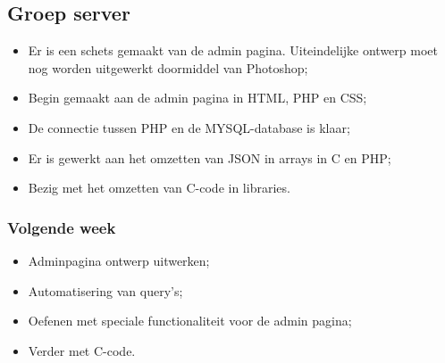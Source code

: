 \subsection*{Groep server}
\begin{itemize}
\item Er is een schets gemaakt van de admin pagina. Uiteindelijke ontwerp moet nog worden uitgewerkt doormiddel van Photoshop;
\item Begin gemaakt aan de admin pagina in HTML, PHP en CSS;
\item De connectie tussen PHP en de MYSQL-database is klaar;
\item Er is gewerkt aan het omzetten van JSON in arrays in C en PHP;
\item Bezig met het omzetten van C-code in libraries.
\end{itemize}


\subsubsection*{Volgende week}
\begin{itemize}
\item Adminpagina ontwerp uitwerken;
\item Automatisering van query’s;
\item Oefenen met speciale functionaliteit voor de admin pagina;
\item Verder met C-code.
\end{itemize}

